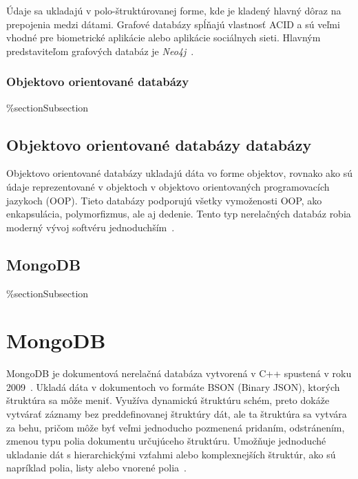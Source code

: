 Údaje sa ukladajú v polo-štruktúrovanej forme, kde je kladený hlavný dôraz na prepojenia medzi dátami. Grafové databázy spĺňajú vlastnosť ACID a sú veľmi vhodné pre biometrické aplikácie alebo aplikácie sociálnych sieti. Hlavným predstaviteľom grafových databáz je \textit{Neo4j}~\cite{NoSQLDBvsRealtionDB}.

%
%
{
	\subsubsection{Objektovo orientované databázy}
}
{
	\%section{Subsection}
	\subsection{Objektovo orientované databázy databázy}
}
\label{subsubsection:object_oriented_db}
Objektovo orientované databázy ukladajú dáta vo forme objektov, rovnako ako sú údaje reprezentované v objektoch v objektovo orientovaných programovacích jazykoch (OOP). Tieto databázy podporujú všetky vymoženosti OOP, ako enkapsulácia, polymorfizmus, ale aj dedenie. Tento typ nerelačných databáz robia moderný vývoj softvéru jednoduchším~\cite{NoSQLDBvsRealtionDB}.

%
%
{
	\subsection{MongoDB}
}
{
	\%section{Subsection}
	\section{MongoDB}
}
\label{subsection:mongodb}
MongoDB je dokumentová nerelačná databáza vytvorená v C++ spustená v roku 2009~\cite{NoSQLDBvsRealtionDB}. Ukladá dáta v dokumentoch vo formáte BSON (Binary JSON), ktorých štruktúra sa môže meniť. Využíva dynamickú štruktúru schém, preto dokáže vytvárať záznamy bez preddefinovanej štruktúry dát, ale ta štruktúra sa vytvára za behu, pričom môže byť veľmi jednoducho pozmenená pridaním, odstránením, zmenou typu polia dokumentu určujúceho štruktúru. Umožňuje jednoduché ukladanie dát s hierarchickými vzťahmi alebo komplexnejších štruktúr, ako sú napríklad polia, listy alebo vnorené polia~\cite{MongoDBvsMySQLCompared}.

